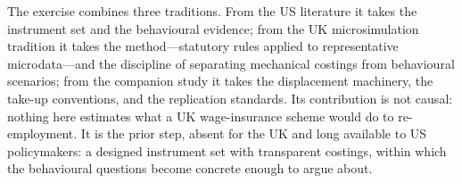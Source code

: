 The exercise combines three traditions. From the US literature it takes
the instrument set and the behavioural evidence; from the UK
microsimulation tradition \citep{dolls2012, brewertasseva2021} it takes
the method---statutory rules applied to representative microdata---and
the discipline of separating mechanical costings from behavioural
scenarios; from the companion study it takes the displacement machinery,
the take-up conventions, and the replication standards. Its contribution
is not causal: nothing here estimates what a UK wage-insurance scheme
would do to re-employment. It is the prior step, absent for the UK and
long available to US policymakers: a designed instrument set with
transparent costings, within which the behavioural questions become
concrete enough to argue about.
